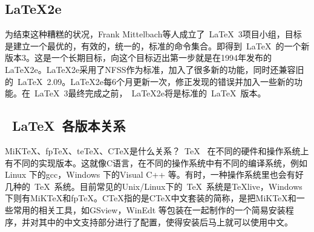 \subsection{LaTeX2e}
为结束这种糟糕的状况，Frank Mittelbach等人成立了~\LaTeX{}~3项目小组，目标是建立一个最优的，有效的，统一的，标准的命令集合。即得到~\LaTeX{}~的一个新版本3。这是一个长期目标，向这个目标迈出第一步就是在1994年发布的LaTeX2e。LaTeX2e采用了NFSS作为标准，加入了很多新的功能，同时还兼容旧的~\LaTeX{}~2.09。LaTeX2e每6个月更新一次，修正发现的错误并加入一些新的功能。在~\LaTeX{}~3最终完成之前，~LaTeX2e将是标准的~\LaTeX{}~版本。
\subsection{~\LaTeX{}~各版本关系}
MiKTeX、fpTeX、teTeX、CTeX是什么关系？~\TeX{}~ 在不同的硬件和操作系统上有不同的实现版本。这就像C语言，在不同的操作系统中有不同的编译系统，例如Linux 下的gcc，Windows 下的Visual C++ 等。有时，一种操作系统里也会有好几种的~\TeX{}~系统。目前常见的Unix/Linux下的~\TeX{}~系统是TeXlive，Windows下则有MiKTeX和fpTeX。CTeX指的是CTeX中文套装的简称，是把MiKTeX和一些常用的相关工具，如GSview，WinEdt 等包装在一起制作的一个简易安装程序，并对其中的中文支持部分进行了配置，使得安装后马上就可以使用中文。